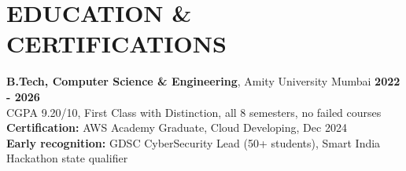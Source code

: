 \documentclass[10pt,a4paper]{article}
\newcommand{\dates}[1]{\hfill {\bfseries #1}}
\begin{document}
\section*{EDUCATION \& CERTIFICATIONS}
\textbf{B.Tech, Computer Science \& Engineering}, Amity University Mumbai \dates{2022 - 2026}\\
CGPA 9.20/10, First Class with Distinction, all 8 semesters, no failed courses\\[2pt]
\textbf{Certification:} AWS Academy Graduate, Cloud Developing, Dec 2024\\[2pt]
\textbf{Early recognition:} GDSC CyberSecurity Lead (50+ students), Smart India Hackathon state
qualifier
\end{document}
